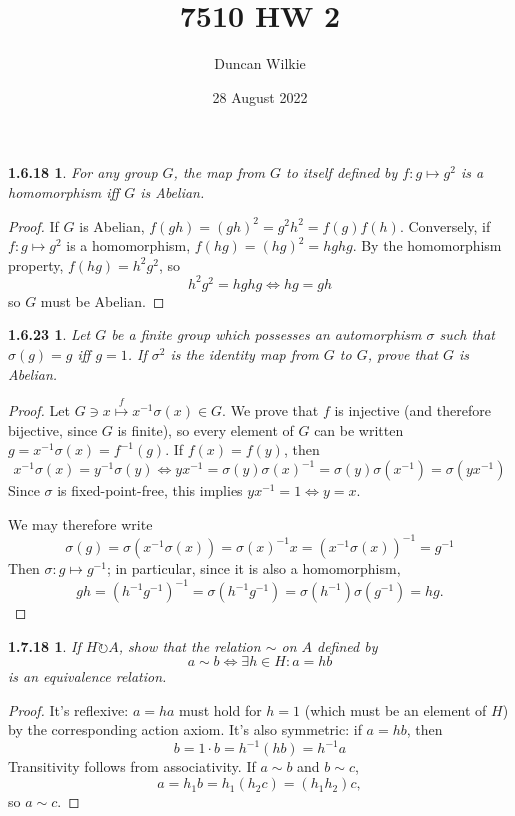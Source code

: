 \documentclass{article}
\title{7510 HW 2}
\author{Duncan Wilkie}
\date{28 August 2022}
\newtheorem*{1.6.18}{1.6.18}
\newtheorem*{1.6.23}{1.6.23}
\newtheorem*{1.7.18}{1.7.18}
\begin{document}
\maketitle

\begin{1.6.18}
  For any group $G$, the map from $G$ to itself defined by $f: g\mapsto g^{2}$ is a homomorphism iff $G$ is Abelian.
\end{1.6.18}
\begin{proof}
  If $G$ is Abelian, $f(gh) = (gh)^{2} = g^{2}h^{2} = f(g)f(h)$.
  Conversely, if $f: g\mapsto g^{2}$ is a homomorphism, $f(hg) = (hg)^{2} = hghg$.
  By the homomorphism property, $f(hg) = h^{2}g^{2}$, so
  \[
    h^{2}g^{2} = hghg \Leftrightarrow hg = gh
  \]
  so $G$ must be Abelian.
\end{proof}

\begin{1.6.23}
  Let $G$ be a finite group which possesses an automorphism $\sigma$ such that $\sigma(g)=g$ iff $g=1$.
  If $\sigma^{2}$ is the identity map from $G$ to $G$, prove that $G$ is Abelian.
\end{1.6.23}
\begin{proof}

  Let $G\ni x\overset{f}{\mapsto} x^{-1}\sigma(x) \in G$.
  We prove that $f$ is injective (and therefore bijective, since $G$ is finite), so every element of $G$ can be written $g = x^{-1}\sigma(x) = f^{-1}(g)$.
  If $f(x) = f(y)$, then
  \[
    x^{-1}\sigma(x) = y^{-1}\sigma(y)
    \Leftrightarrow yx^{-1} = \sigma(y)\sigma(x)^{-1} = \sigma(y)\sigma(x^{-1}) = \sigma(yx^{-1})
  \]
  Since $\sigma$ is fixed-point-free, this implies $yx^{-1} = 1 \Leftrightarrow y = x$.

  We may therefore write
  \[
    \sigma(g) = \sigma(x^{-1}\sigma(x)) = \sigma(x)^{-1}x = (x^{-1}\sigma(x))^{-1} = g^{-1}
  \]
  Then $\sigma: g\mapsto g^{-1}$; in particular, since it is also a homomorphism,
  \[
    gh = (h^{-1}g^{-1})^{-1} = \sigma(h^{-1}g^{-1}) = \sigma(h^{-1})\sigma(g^{-1}) = hg.
  \]


\end{proof}

\begin{1.7.18}
  If $H\circlearrowright A$, show that the relation $\sim$ on $A$ defined by
  \[
    a\sim b \Leftrightarrow \exists h\in H: a = hb
  \]
  is an equivalence relation.
\end{1.7.18}

\begin{proof}
  It's reflexive: $a = h a$ must hold for $h = 1$ (which must be an element of $H$) by the corresponding action axiom.
  It's also symmetric: if $a = hb$, then
  \[
    b = 1\cdot b = h^{-1}(hb) = h^{-1}a
  \]
  Transitivity follows from associativity.
  If $a\sim b$ and $b\sim c$,
  \[
    a = h_{1}b = h_{1}(h_{2}c) = (h_{1}h_{2}) c,
  \]
  so $a\sim c$.
\end{proof}
\end{document}
